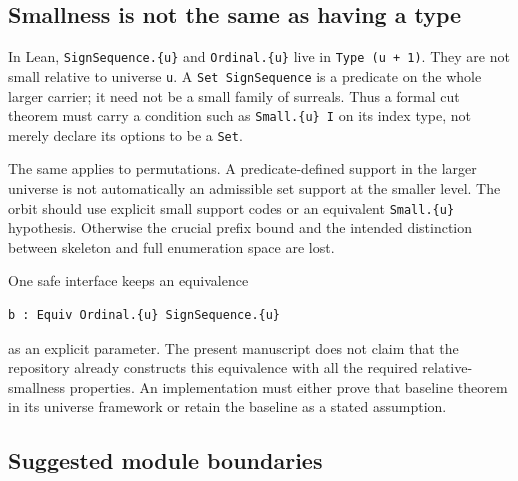 \documentclass[11pt]{article}
\theoremstyle{definition}
\theoremstyle{remark}
\begin{document}
\subsection{Smallness is not the same as having a type}

In Lean, \texttt{SignSequence.\{u\}} and
\texttt{Ordinal.\{u\}} live in \texttt{Type (u + 1)}.
They are not small relative to universe \texttt{u}. A
\texttt{Set SignSequence} is a predicate on the whole larger carrier;
it need not be a small family of surreals. Thus a formal cut theorem
must carry a condition such as \texttt{Small.\{u\} I} on its index type,
not merely declare its options to be a \texttt{Set}.

The same applies to permutations. A predicate-defined support in the
larger universe is not automatically an admissible set support at the
smaller level. The orbit should use explicit small support codes or
an equivalent \texttt{Small.\{u\}} hypothesis. Otherwise the crucial
prefix bound and the intended distinction between skeleton and full
enumeration space are lost.

One safe interface keeps an equivalence
\begin{lstlisting}
b : Equiv Ordinal.{u} SignSequence.{u}
\end{lstlisting}
as an explicit parameter. The present manuscript does not
claim that the repository already constructs this equivalence with
all the required relative-smallness properties. An implementation
must either prove that baseline theorem in its universe framework or
retain the baseline as a stated assumption.

\subsection{Suggested module boundaries}
\end{document}
